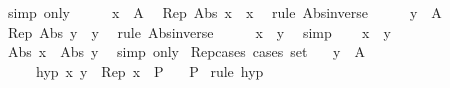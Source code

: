 \begin{isabellebody}
\ {\isacharparenleft}{\kern0pt}simp\ only{\isacharcolon}{\kern0pt}{\isacharparenright}{\kern0pt}\isanewline
\ \ \isamarkupfalse%
\ \isamarkupfalse%
\ {\isacartoucheopen}x\ {\isasymin}\ A{\isacartoucheclose}\ \isamarkupfalse%
\ {\isachardoublequoteopen}Rep\ {\isacharparenleft}{\kern0pt}Abs\ x{\isacharparenright}{\kern0pt}\ {\isacharequal}{\kern0pt}\ x{\isachardoublequoteclose}\ \isamarkupfalse%
\ {\isacharparenleft}{\kern0pt}rule\ Abs{\isacharunderscore}{\kern0pt}inverse{\isacharparenright}{\kern0pt}\isanewline
\ \ \isamarkupfalse%
\ \isamarkupfalse%
\ {\isacartoucheopen}y\ {\isasymin}\ A{\isacartoucheclose}\ \isamarkupfalse%
\ {\isachardoublequoteopen}Rep\ {\isacharparenleft}{\kern0pt}Abs\ y{\isacharparenright}{\kern0pt}\ {\isacharequal}{\kern0pt}\ y{\isachardoublequoteclose}\ \isamarkupfalse%
\ {\isacharparenleft}{\kern0pt}rule\ Abs{\isacharunderscore}{\kern0pt}inverse{\isacharparenright}{\kern0pt}\isanewline
\ \ \isamarkupfalse%
\ \isamarkupfalse%
\ {\isachardoublequoteopen}x\ {\isacharequal}{\kern0pt}\ y{\isachardoublequoteclose}\ \isamarkupfalse%
\ simp\isanewline
{}\isamarkupfalse%
\isanewline
\ \ \isamarkupfalse%
\ {\isachardoublequoteopen}x\ {\isacharequal}{\kern0pt}\ y{\isachardoublequoteclose}\isanewline
\ \ \isamarkupfalse%
\ \isamarkupfalse%
\ {\isachardoublequoteopen}Abs\ x\ {\isacharequal}{\kern0pt}\ Abs\ y{\isachardoublequoteclose}\ \isamarkupfalse%
\ {\isacharparenleft}{\kern0pt}simp\ only{\isacharcolon}{\kern0pt}{\isacharparenright}{\kern0pt}\isanewline
{}\isamarkupfalse%
%
\endisatagproof
{\isafoldproof}%
%
\isadelimproof
\isanewline
%
\endisadelimproof
\isanewline
{}\isamarkupfalse%
\ Rep{\isacharunderscore}{\kern0pt}cases\ {\isacharbrackleft}{\kern0pt}cases\ set{\isacharbrackright}{\kern0pt}{\isacharcolon}{\kern0pt}\isanewline
\ \ \ {\isachardoublequoteopen}y\ {\isasymin}\ A{\isachardoublequoteclose}\isanewline
\ \ \ \ \ hyp{\isacharcolon}{\kern0pt}\ {\isachardoublequoteopen}{\isasymAnd}x{\isachardot}{\kern0pt}\ y\ {\isacharequal}{\kern0pt}\ Rep\ x\ {\isasymLongrightarrow}\ P{\isachardoublequoteclose}\isanewline
\ \ \ P\isanewline
%
\isadelimproof
%
\endisadelimproof
%
\isatagproof
{}\isamarkupfalse%
\ {\isacharparenleft}{\kern0pt}rule\ hyp{\isacharparenright}{\kern0pt}\isanewline

\end{isabellebody}
